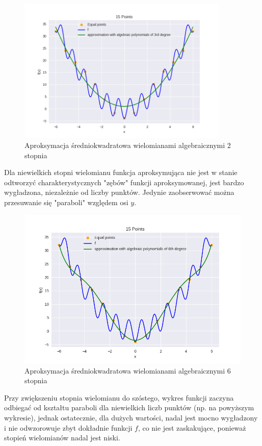 \documentclass{article}
\begin{document}
\begin{figure}[H]
    \centering
    \includegraphics[width=0.9\textwidth]{img/algpoly_2_15.png}
    \caption{Aproksymacja średniokwadratowa wielomianami algebraicznymi 2 stopnia}
\end{figure}

Dla niewielkich stopni wielomianu funkcja aproksymująca nie jest w stanie odtworzyć charakterystycznych "zębów" funkcji aproksymowanej,
jest bardzo wygładzona, niezależnie od liczby punktów. Jedynie zaobserwować można przesuwanie się "paraboli" względem osi $y$.

\begin{figure}[H]
    \centering
    \includegraphics[width=\textwidth]{img/algpoly_6_15.png}
    \caption{Aproksymacja średniokwadratowa wielomianami algebraicznymi 6 stopnia}
\end{figure}

Przy zwiększeniu stopnia wielomianu do szóstego, wykres funkcji zaczyna odbiegać od kształtu paraboli dla niewielkich liczb punktów (np.
na powyższym wykresie), jednak ostatecznie, dla dużych wartości, nadal jest mocno wygładzony i nie odwzorowuje zbyt dokładnie funkcji
$f$, co nie jest zaskakujące, ponieważ stopień wielomianów nadal jest niski.
\end{document}
